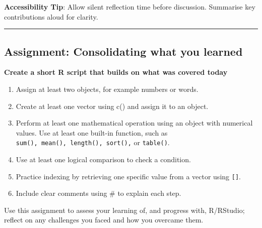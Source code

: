 \documentclass[
  letterpaper,
  DIV=11,
  numbers=noendperiod]{scrartcl}
\providecommand{\tightlist}{%
  \setlength{\itemsep}{0pt}\setlength{\parskip}{0pt}}
\begin{document}
\textbf{Accessibility Tip}: Allow silent reflection time before
discussion. Summarise key contributions aloud for clarity.

\begin{center}\rule{0.5\linewidth}{0.5pt}\end{center}

\subsection{Assignment: Consolidating what you
learned}\label{assignment-consolidating-what-you-learned}

\textbf{Create a short R script that builds on what was covered today}

\begin{enumerate}
\def\labelenumi{\arabic{enumi}.}
\tightlist
\item
  Assign at least two objects, for example numbers or words.
\item
  Create at least one vector using c() and assign it to an object.
\item
  Perform at least one mathematical operation using an object with
  numerical values. Use at least one built-in function, such as
  \texttt{sum(),\ mean(),\ length(),\ sort(),} or \texttt{table()}.
\item
  Use at least one logical comparison to check a condition.
\item
  Practice indexing by retrieving one specific value from a vector using
  \texttt{{[}{]}}.
\item
  Include clear comments using \# to explain each step.
\end{enumerate}

\begin{tcolorbox}[enhanced jigsaw, arc=.35mm, bottomrule=.15mm, bottomtitle=1mm, breakable, colback=white, colbacktitle=quarto-callout-tip-color!10!white, colframe=quarto-callout-tip-color-frame, coltitle=black, left=2mm, leftrule=.75mm, opacityback=0, opacitybacktitle=0.6, rightrule=.15mm, title=\textcolor{quarto-callout-tip-color}{\faLightbulb}\hspace{0.5em}{Self-Assessment}, titlerule=0mm, toprule=.15mm, toptitle=1mm]

Use this assignment to assess your learning of, and progress with,
R/RStudio; reflect on any challenges you faced and how you overcame
them.

\end{tcolorbox}
\end{document}
